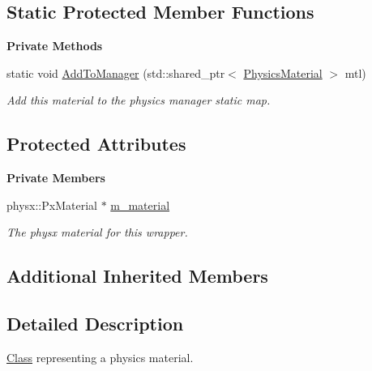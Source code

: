 \subsection*{Static Protected Member Functions}
\begin{Indent}\textbf{ Private Methods}\par
\begin{DoxyCompactItemize}
\item 
\mbox{\label{classrev_1_1_physics_material_aa04c7055a9e5d7f6d2c3a5358efda59a}} 
static void \mbox{\hyperlink{classrev_1_1_physics_material_aa04c7055a9e5d7f6d2c3a5358efda59a}{Add\+To\+Manager}} (std\+::shared\+\_\+ptr$<$ \mbox{\hyperlink{classrev_1_1_physics_material}{Physics\+Material}} $>$ mtl)
\begin{DoxyCompactList}\small\item\em Add this material to the physics manager static map. \end{DoxyCompactList}\end{DoxyCompactItemize}
\end{Indent}
\subsection*{Protected Attributes}
\begin{Indent}\textbf{ Private Members}\par
\begin{DoxyCompactItemize}
\item 
\mbox{\label{classrev_1_1_physics_material_a18a274228d0ff33dd763e69c91dba327}} 
physx\+::\+Px\+Material $\ast$ \mbox{\hyperlink{classrev_1_1_physics_material_a18a274228d0ff33dd763e69c91dba327}{m\+\_\+material}}
\begin{DoxyCompactList}\small\item\em The physx material for this wrapper. \end{DoxyCompactList}\end{DoxyCompactItemize}
\end{Indent}
\subsection*{Additional Inherited Members}


\subsection{Detailed Description}
\mbox{\hyperlink{struct_class}{Class}} representing a physics material. 

